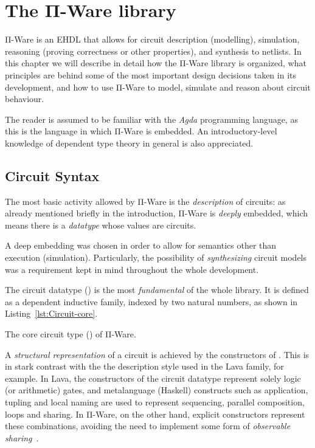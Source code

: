 \chapter{The Π-Ware library}
\label{chap:piware}

    Π-Ware is an \ac{EHDL} that allows for circuit description (modelling),
    simulation, reasoning (proving correctness or other properties), and synthesis to netlists.
    In this chapter we will describe in detail how the Π-Ware library is organized,
    what principles are behind some of the most important design decisions taken in its development,
    and how to use Π-Ware to model, simulate and reason about circuit behaviour.

    The reader is assumed to be familiar with the \emph{Agda} programming language,
    as this is the language in which Π-Ware is embedded.
    An introductory-level knowledge of dependent type theory in general is also appreciated.


    \section{Circuit Syntax}
    \label{sec:circuit-syntax}
        The most basic activity allowed by Π-Ware is the \emph{description} of circuits:
        as already mentioned briefly in the introduction, Π-Ware is \emph{deeply} embedded,
        which means there is a \emph{datatype} whose values are circuits.

        A deep embedding was chosen in order to allow for semantics other than execution (simulation).
        Particularly, the possibility of \emph{synthesizing} circuit models was a requirement
        kept in mind throughout the whole development.

        The circuit datatype () is the most \emph{fundamental} of the whole library.
        It is defined as a dependent inductive family, indexed by two natural numbers,
        as shown in Listing~\ref{lst:Circuit-core}.

        \begin{listing}[ht]
            \caption{The core circuit type () of Π-Ware. \label{lst:Circuit-core}}
        \end{listing}

        A \emph{structural representation} of a circuit is achieved by the constructors of .
        This is in stark contrast with the the description style used in the Lava family, for example.
        In Lava, the constructors of the circuit datatype represent solely logic (or arithmetic) gates,
        and metalanguage (Haskell) constructs such as application, tupling and local naming are
        used to represent sequencing, parallel composition, loops and sharing.
        In Π-Ware, on the other hand, explicit constructors represent these combinations,
        avoiding the need to implement some form of \emph{observable sharing}~\cite{gill-typesafe-observable-sharing}.

